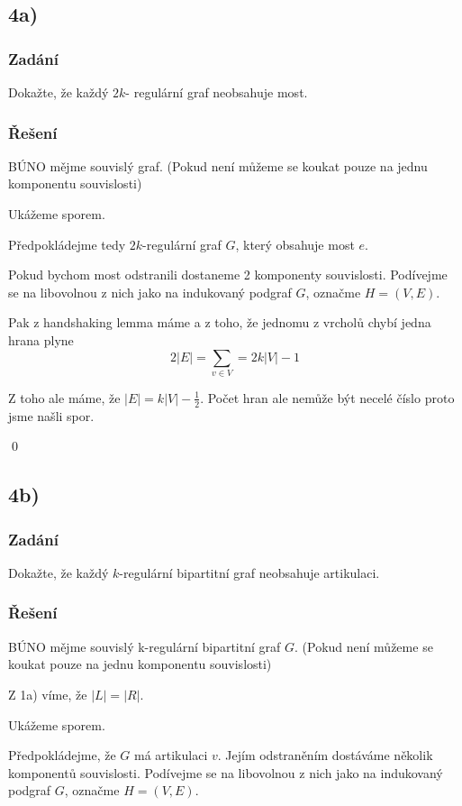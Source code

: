 \documentclass[../main.tex]{subfiles}
\begin{document}
\subsection{4a)}
\subsubsection*{Zadání}
Dokažte, že každý $2k$- regulární graf neobsahuje most.
\subsubsection*{Řešení}

BÚNO mějme souvislý graf. (Pokud není můžeme se koukat pouze na jednu komponentu souvislosti)

Ukážeme sporem.

Předpokládejme tedy $2k$-regulární graf $G$, který obsahuje most $e$.

Pokud bychom most odstranili dostaneme 2 komponenty souvislosti. Podívejme se na libovolnou z nich jako na indukovaný podgraf  $G$, označme $H=(V,E)$.

Pak z handshaking lemma máme a z toho, že jednomu z vrcholů chybí jedna hrana plyne
\begin{equation*}
    2|E| = \sum_{v\in V} = 2k|V| - 1
\end{equation*}

Z toho ale máme, že $|E| = k|V| - \frac{1}{2}$. Počet hran ale nemůže být necelé číslo proto jsme našli spor. 

\qed

\subsection{4b)}
\subsubsection*{Zadání}
Dokažte, že každý $k$-regulární bipartitní graf neobsahuje artikulaci.

\subsubsection*{Řešení}

BÚNO mějme souvislý k-regulární bipartitní graf $G$. (Pokud není můžeme se koukat pouze na jednu komponentu souvislosti)

Z 1a) víme, že  $|L|=|R|$.

Ukážeme sporem.

Předpokládejme, že $G$ má artikulaci $v$. Jejím odstraněním dostáváme několik komponentů souvislosti. 
Podívejme se na libovolnou z nich jako na indukovaný podgraf  $G$, označme $H=(V,E)$.
\end{document}
